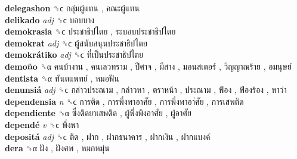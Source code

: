 \textbf{delegashon} ␝ϲ   กลุ่มผู้แทน ,  คณะผู้แทน   \\
\textbf{delikado} \emph{adj}  ␝ϲ   บอบบาง   \\
\textbf{demokrasia} ␝ϲ   ประชาธิปไตย ,  ระบอบประชาธิปไตย   \\
\textbf{demokrat} \emph{adj}  ␝ϲ   ผู้สนับสนุนประชาธิปไตย   \\
\textbf{demokrátiko} \emph{adj}  ␝ϲ   ที่เป็นประชาธิปไตย   \\
\textbf{demoño} ␝α   คนบ้างาน ,  คนเลวทราม ,  ปีศาจ ,  ผีสาง ,  มอนสเตอร์ ,  วิญญาณร้าย ,  อมนุษย์   \\
\textbf{dentista} ␝α   ทันตแพทย์ ,  หมอฟัน   \\
\textbf{denunsiá} \emph{adj}  ␝ϲ   กล่าวประณาม ,  กล่าวหา ,  ตราหน้า ,  ประณาม ,  ฟ้อง ,  ฟ้องร้อง ,  หาว่า   \\
\textbf{dependensia} \emph{n}  ␝ϲ   การติด ,  การพึ่งพาอาศัย ,  การพึ่งพาอา่ศัย ,  การเสพติด   \\
\textbf{dependiente} ␝α   ซึ่งติดยาเสพติด ,  ผู้พึ่งพิงอาศัย ,  ผู้อาศัย   \\
\textbf{dependé} \emph{v}  ␝ϲ   พึ่งพา   \\
\textbf{depositá} \emph{adj}  ␝ϲ   ติด ,  ฝาก ,  ฝากธนาคาร ,  ฝากเงิน ,  ฝากแบงค์   \\
\textbf{dera} ␝α   ฝัง ,  ฝังศพ ,  หมกหมุ่น   \\
